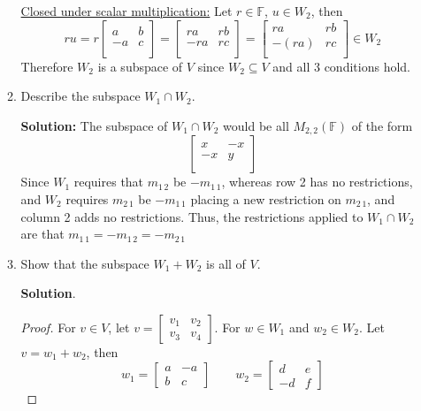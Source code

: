 \documentclass[12pt]{article}
\newcommand{\F}{\mathbb{F}}
\begin{document}
\begin{enumerate}
\begin{enumerate}
\begin{mybox}
            \noindent \underline{Closed under scalar multiplication:} Let $r \in \F$, $u \in W_2$, then
            $$ru = r \left[
              \begin{array}{cc}
                a & b \\
                -a & c \\
              \end{array}
            \right] = \left[
              \begin{array}{cc}
                ra & rb \\
                -ra & rc \\
              \end{array}
            \right] =
            \left[
              \begin{array}{cc}
                ra & rb \\
                -(ra) & rc \\
              \end{array}
            \right] \in W_2$$
            Therefore $W_2$ is a subspace of $V$ since $W_2 \subseteq V$ and all 3 conditions hold.
        \end{mybox}
    \vspace{1in}
      \item Describe the subspace $W_1 \cap W_2$.
      \begin{mybox}
      \textbf{Solution:} The subspace of $W_1 \cap W_2$ would be all $M_{2,2}(\F)$ of the form
      $$\left[
              \begin{array}{rr}
                x & -x \\
                -x & y \\
              \end{array}
            \right]$$
            Since $W_1$ requires that $m_{1\,2}$ be $-m_{1\,1}$, whereas row 2 has no restrictions, and $W_2$ requires $m_{2\,1}$ be $-m_{1\,1}$ placing a new restriction on $m_{2\,1}$, and column 2 adds no restrictions. Thus, the  restrictions applied to $W_1 \cap W_2$ are that $m_{1\,1} = -m_{1\,2} = -m_{2\,1} $
      \end{mybox}
      \newpage
      \item Show that the subspace $W_1 + W_2$ is all of $V$.
      \begin{mybox}
        \textbf{Solution}. \begin{proof} For $v \in V$, let $v = \begin{bmatrix} v_1 & v_2 \\ v_3 & v_4 \end{bmatrix}$. For $w \in W_1$ and $w_2 \in W_2$. Let $v = w_1 + w_2$, then
        $$w_1 = \begin{bmatrix} a & -a \\ b & c \end{bmatrix} \qquad w_2 = \begin{bmatrix} d & e \\ -d & f \end{bmatrix}$$
              

\end{proof}
\end{mybox}
\end{enumerate}
\end{enumerate}
\end{document}
